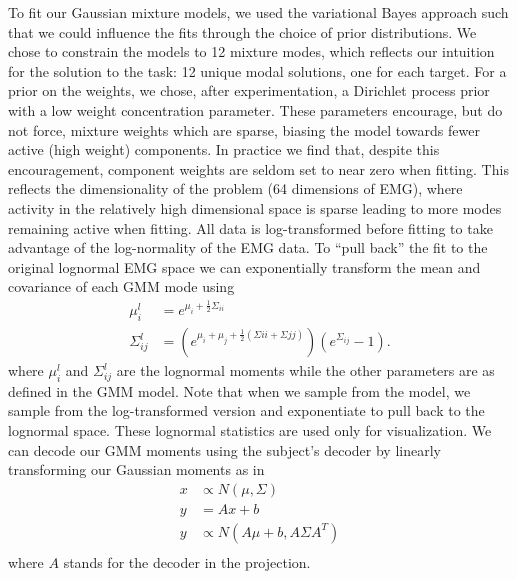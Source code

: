 \documentclass[../main.tex]{subfiles}
\begin{document}
To fit our Gaussian mixture models, we used the variational Bayes approach such that we could influence the fits through the choice of prior distributions. We chose to constrain the models to 12 mixture modes, which reflects our intuition for the solution to the task: 12 unique modal solutions, one for each target. For a prior on the weights, we chose, after experimentation, a Dirichlet process prior with a low weight concentration parameter. These parameters encourage, but do not force, mixture weights which are sparse, biasing the model towards fewer active (high weight) components. In practice we find that, despite this encouragement, component weights are seldom set to near zero when fitting. This reflects the dimensionality of the problem (64 dimensions of EMG), where activity in the relatively high dimensional space is sparse leading to more modes remaining active when fitting. All data is log-transformed before fitting to take advantage of the log-normality of the EMG data. To ``pull back'' the fit to the original lognormal EMG space we can exponentially transform the mean and covariance of each GMM mode using
%
\begin{align}
  \mu_i^l &= e^{{\mu}_i + \frac{1}{2}\Sigma_{ii}}\\
  \Sigma_{ij}^l &= \left(e^{\mu_i + \mu_j + \frac{1}{2}\left(\Sigma{ii} + \Sigma{jj}\right)}\right)\left(e^{\Sigma_{ij}} - 1\right).
\end{align}
%
where $\mu_i^l$ and $\Sigma_{ij}^l$ are the lognormal moments while the other parameters are as defined in the GMM model. Note that when we sample from the model, we sample from the log-transformed version and exponentiate to pull back to the lognormal space. These lognormal statistics are used only for visualization. We can decode our GMM moments using the subject's decoder by linearly transforming our Gaussian moments as in
%
\begin{align}
    x &\propto N(\mu, \Sigma) \\ 
    y &= Ax + b \\ 
  y &\propto N(A\mu + b, A\Sigma A^T) \\ 
\end{align}
%
where $A$ stands for the decoder in the projection.

\end{document}
